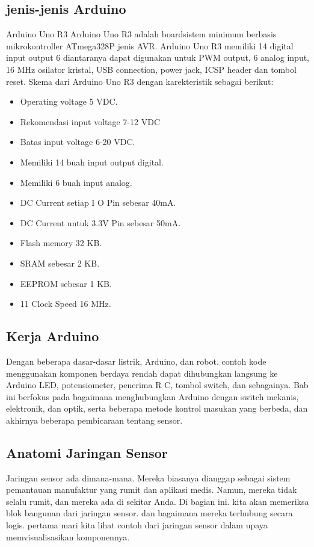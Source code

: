 \subsection{jenis-jenis Arduino}
Arduino Uno R3
Arduino Uno R3 adalah boardsistem minimum berbasis mikrokontroller ATmega328P jenis AVR. Arduino Uno R3 memiliki 14 digital input output 6 diantaranya dapat digunakan untuk PWM output, 6 analog input, 16 MHz osilator kristal, USB connection, power jack, ICSP header dan tombol reset. Skema dari Arduino Uno R3 dengan
karekteristik sebagai berikut:
\begin{itemize}
\item Operating voltage 5 VDC.

\item Rekomendasi input voltage 7-12
VDC
\item Batas input voltage 6-20 VDC.
\item Memiliki 14 buah input output digital.
\item Memiliki 6 buah input analog.
\item DC Current setiap I O Pin sebesar 40mA.
\item DC Current untuk 3.3V Pin sebesar 50mA.
\item Flash memory 32 KB.
\item SRAM sebesar 2 KB.
\item EEPROM sebesar 1 KB.
\item 11 Clock Speed 16 MHz.
\end{itemize}

\subsection{Kerja Arduino}
Dengan beberapa dasar-dasar listrik, Arduino, dan robot.
contoh kode menggunakan komponen berdaya rendah dapat dihubungkan langsung ke Arduino LED, potensiometer, penerima R C, tombol switch, dan sebagainya. 
Bab ini berfokus pada bagaimana menghubungkan Arduino dengan switch mekanis, elektronik, dan optik, serta beberapa metode kontrol masukan yang berbeda, dan akhirnya beberapa pembicaraan tentang sensor.

\subsection{Anatomi Jaringan Sensor}
Jaringan sensor ada dimana-mana. Mereka biasanya dianggap sebagai sistem pemantauan manufaktur yang rumit
dan aplikasi medis. Namun, mereka tidak selalu rumit, dan mereka ada di sekitar Anda.
Di bagian ini. kita akan memeriksa blok bangunan dari jaringan sensor. dan bagaimana mereka terhubung secara logis.
pertama mari kita lihat contoh dari jaringan sensor dalam upaya memvisualisasikan komponennya.


